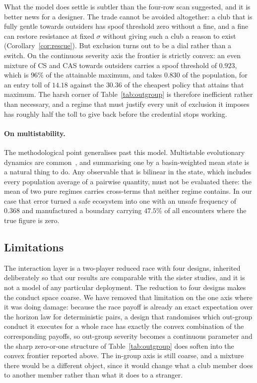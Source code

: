 \documentclass[preprint,12pt]{elsarticle}
\theoremstyle{plain}
\theoremstyle{definition}
\newcommand{\CS}{\textsf{CS}}
\newcommand{\CAS}{\textsf{CAS}}
\begin{document}
What the model does settle is subtler than the four-row scan suggested, and it
is better news for a designer. The trade cannot be avoided altogether: a club
that is fully gentle towards outsiders has spoof threshold zero without a fine,
and a fine can restore resistance at fixed $\sigma$ without giving such a club
a reason to exist (Corollary~\ref{cor:rescue}). But exclusion turns out to be a
dial rather than a switch. On the continuous severity axis the frontier is
strictly convex: an even mixture of \CS{} and \CAS{} towards outsiders carries
a spoof threshold of $0.923$, which is $96\%$ of the attainable maximum, and
takes $0.830$ of the population, for an entry toll of $14.18$ against the
$30.36$ of the cheapest policy that attains that maximum. The harsh corner of
Table~\ref{tab:outgroup} is therefore inefficient rather than necessary, and a
regime that must justify every unit of exclusion it imposes has roughly half
the toll to give back before the credential stops working.

\paragraph{On multistability.} The methodological point generalises past this
model. Multistable evolutionary dynamics are
common~\citep{hofbauer1998evolutionary,sandholm2010population}, and summarising one
by a basin-weighted mean state is a natural thing to do. Any observable that is
bilinear in the state, which includes every population average of a pairwise
quantity, must not be evaluated there: the mean of two pure regimes carries
cross-terms that neither regime contains. In our case that error turned a safe
ecosystem into one with an unsafe frequency of $0.368$ and manufactured a
boundary carrying $47.5\%$ of all encounters where the true figure is zero.

\subsection{Limitations}
\label{sec:limitations}

The interaction layer is a two-player reduced race with four designs, inherited
deliberately so that our results are comparable with the sister studies, and it
is not a model of any particular deployment. The reduction to four designs
makes the conduct space coarse. We have removed that limitation on the one axis
where it was doing damage: because the race payoff is already an exact
expectation over the horizon law for deterministic pairs, a design that
randomises which out-group conduct it executes for a whole race has exactly the
convex combination of the corresponding payoffs, so out-group severity becomes
a continuous parameter and the sharp zero-or-one structure of
Table~\ref{tab:outgroup} does soften into the convex frontier reported above.
The in-group axis is still coarse, and a mixture there would be a different
object, since it would change what a club member does to another member rather
than what it does to a stranger.
\end{document}
